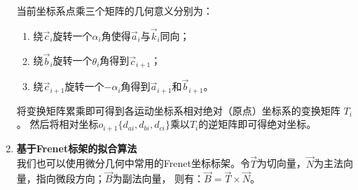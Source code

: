 \begin{enumerate}[label=(\Alph*)]
    当前坐标系点乘三个矩阵的几何意义分别为：\\
    \begin{enumerate}
        \item 绕$\vec c_i$旋转一个$\alpha_i$角使得$\vec a_i$与$\vec k_i$同向；
        \item 绕$\vec b_i$旋转一个$\theta_i$角得到$\vec c_{i+1}$；
        \item 绕$\vec c_{i+1}$旋转一个$-\alpha_i$角得到$\vec a_{i+1}$和$\vec b_{i+1}$。
    \end{enumerate}

    将变换矩阵累乘即可得到各运动坐标系相对绝对（原点）坐标系的变换矩阵 $T_i$。
    然后将相对坐标$o_{i+1} \{d_{ai}, d_{bi}, d_{ci}\}$乘以$T_i$的逆矩阵即可得绝对坐标。

    \item \textbf{基于Frenet标架的拟合算法} \\
    我们也可以使用微分几何中常用的Frenet坐标标架\cite{用于光纤光栅曲线重建算法的坐标点拟合}。令$\vec T$为切向量，$\vec N$为主法向量，指向微段方向；$\vec B$为副法向量，
    则有：$\vec B = \vec T \times \vec N$。


\end{enumerate}
